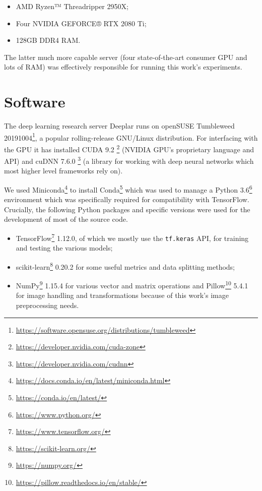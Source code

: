 \begin{itemize}
    \item AMD Ryzen™ Threadripper 2950X;
    \item Four NVIDIA GEFORCE® RTX 2080 Ti;
    \item 128GB DDR4 RAM.
\end{itemize}

The latter much more capable server (four state-of-the-art consumer \ac{GPU} and lots of \ac{RAM}) was effectively responsible for running this work's experiments.

\section{Software}

The deep learning research server Deeplar runs on openSUSE Tumbleweed 20191004\footnote{\url{https://software.opensuse.org/distributions/tumbleweed}}, a popular rolling-release GNU/Linux distribution. For interfacing with the \ac{GPU} it has installed CUDA 9.2 \footnote{\url{https://developer.nvidia.com/cuda-zone}} (NVIDIA GPU's proprietary language and API) and cuDNN 7.6.0 \footnote{\url{https://developer.nvidia.com/cudnn}} (a library for working with deep neural networks which most higher level frameworks rely on).

We used Miniconda\footnote{\url{https://docs.conda.io/en/latest/miniconda.html}} to install Conda\footnote{\url{https://conda.io/en/latest/}} which was used to manage a Python 3.6\footnote{\url{https://www.python.org/}} environment which was specifically required for compatibility with TensorFlow. Crucially, the following Python packages and specific versions were used for the development of most of the source code.

\begin{itemize}
    \item TensorFlow\footnote{\url{https://www.tensorflow.org/}} 1.12.0, of which we mostly use the \verb|tf.keras| API, for training and testing the various models;
    \item scikit-learn\footnote{\url{https://scikit-learn.org/}} 0.20.2 for some useful metrics and data splitting methods;
    \item NumPy\footnote{\url{https://numpy.org/}} 1.15.4 for various vector and matrix operations and Pillow\footnote{\url{https://pillow.readthedocs.io/en/stable/}} 5.4.1 for image handling and transformations because of this work's image preprocessing needs.
\end{itemize}
